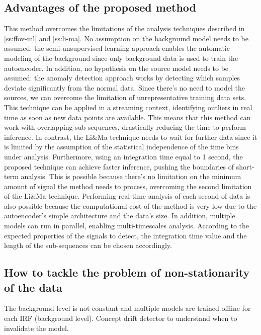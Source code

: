 \subsection{Advantages of the proposed method}
This method overcomes the limitations of the analysis techniques described in \autoref{ss:ffov-ml} and \autoref{ss:li-ma}. No assumption on the background model needs to be assumed: the semi-unsupervised learning approach enables the automatic modeling of the background since only background data is used to train the autoencoder. In addition, no hypothesis on the source model needs to be assumed: the anomaly detection approach works by detecting which samples deviate significantly from the normal data. Since there's no need to model the sources, we can overcome the limitation of unrepresentative training data sets. This technique can be applied in a streaming context, identifying outliers in real time as soon as new data points are available. This means that this method can work with overlapping sub-sequences, drastically reducing the time to perform inference. In contrast, the Li\&Ma technique needs to wait for further data since it is limited by the assumption of the statistical independence of the time bins under analysis. Furthermore, using an integration time equal to 1 second, the proposed technique can achieve faster inference, pushing the boundaries of short-term analysis. This is possible because there's no limitation on the minimum amount of signal the method needs to process, overcoming the second limitation of the Li\&Ma technique. Performing real-time analysis of each second of data is also possible because the computational cost of the method is very low due to the autoencoder's simple architecture and the data's size. In addition, multiple models can run in parallel, enabling multi-timescales analysis. According to the expected properties of the signals to detect, the integration time value and the length of the sub-sequences can be chosen accordingly. 


\subsection{How to tackle the problem of non-stationarity of the data}
The background level is not constant and multiple models are trained offline for each IRF (background level).
Concept drift detector to understand when to invalidate the model.

